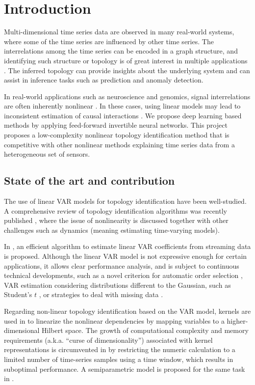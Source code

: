 
\section{Introduction}
Multi-dimensional time series data are observed in many real-world systems, where some of the time series are influenced by other time series. The interrelations among the time series can be encoded in a graph structure, and identifying such structure or topology is of great interest in multiple applications \cite{giannakis2018topology}.  The inferred topology can provide insights about the underlying system and can assist in inference tasks such as prediction and anomaly detection. 

In real-world applications such as neuroscience and genomics, signal interrelations are often inherently nonlinear \cite{chen2018dynamic,fujita2010granger,shen2019nonlinear}. In these cases, using linear models may lead to inconsistent estimation of causal interactions \cite{tank2017interpretable}. We propose deep learning based methods by applying feed-forward invertible neural networks. This project proposes a low-complexity nonlinear topology identification method that is competitive with other nonlinear methods explaining time series data from a heterogeneous set of sensors.

\subsection{State of the art and contribution}

The use of linear VAR models for topology identification have been well-studied. A comprehensive review of topology identification algorithms was recently published \cite{giannakis2018topology}, where the issue of nonlinearity is discussed together with other challenges such as dynamics (meaning estimating time-varying models). 

In \cite{zaman2020online}, an efficient algorithm to estimate linear VAR coefficients from streaming data is proposed. Although the linear VAR model is not expressive enough for certain applications, it allows clear performance analysis, and is subject to continuous technical developments, such as a novel criterion for automatic order selection \cite{nassif2021automatic}, VAR estimation considering distributions different to the Gaussian, such as Student's $t$ \cite{zhou2021parameter}, or strategies to deal with missing data \cite{zhou2021parameter,ioannidis2019semiblind,zaman2020online}.

Regarding non-linear topology identification based on the VAR model, kernels are used in  \cite{shen2018online,money2021online} to linearize the nonlinear dependencies by mapping variables to a higher-dimensional Hilbert space. The growth of computational complexity and memory requirements (a.k.a.  “curse  of dimensionality”) associated with kernel representations is circumvented in \cite{shen2018online,money2021online} by  restricting  the  numeric  calculation  to  a  limited number  of  time-series  samples  using  a  time  window,  which results in suboptimal performance. A semiparametric model is proposed for the same task in \cite{farnoosh2017semiparametric}.

